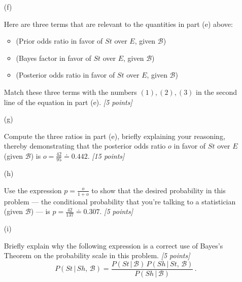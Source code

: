 \documentclass[12pt]{article}
\newcommand{\given}{\, | \,}
\begin{document}
\begin{itemize}
\begin{center}
\normalsize

\end{center}

\vspace*{0.5in}

\item[(f)]

Here are three terms that are relevant to the quantities in part (e) above:

\begin{itemize}

\item

(Prior odds ratio in favor of $St$ over $E$, given $\mathcal{ B }$)

\item

(Bayes factor in favor of $St$ over $E$, given $\mathcal{ B }$)

\item

(Posterior odds ratio in favor of $St$ over $E$, given $\mathcal{ B }$)

\end{itemize}

Match these three terms with the numbers $( 1 ), ( 2 ), ( 3 )$ in the second line of the equation in part (e). \textit{[5 points]}

\vspace*{0.5in}

\item[(g)]

Compute the three ratios in part (e), briefly explaining your reasoning, thereby demonstrating that the posterior odds ratio $o$ in favor of $St$ over $E$ (given $\mathcal{ B }$) is $o = \frac{ 42 }{ 95 } \doteq 0.442$. \textit{[15 points]}

\vspace*{1.0in}

\item[(h)]

Use the expression $p = \frac{ o }{ 1 + o }$ to show that the desired probability in this problem --- the conditional probability that you're talking to a statistician (given $\mathcal{ B }$) --- is $p = \frac{ 42 }{ 137 } \doteq 0.307$. \textit{[5 points]}

\vspace*{0.75in}

\item[(i)]

Briefly explain why the following expression is a correct use of Bayes's Theorem on the probability scale in this problem. \textit{[5 points]}
\begin{equation} \label{e:bayes-1}
P ( St \given Sh, \, \mathcal{ B } ) = \frac{ P ( St \given \mathcal{ B } ) \, P ( Sh \given St, \, \mathcal{ B } ) }{ P ( Sh \given \mathcal{ B } ) } \, .
\end{equation}


\end{itemize}
\end{document}
